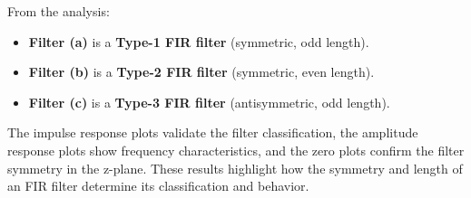 \documentclass[a4paper,12pt]{article}
\begin{document}
From the analysis:

\begin{itemize}
    \item \textbf{Filter (a)} is a \textbf{Type-1 FIR filter} (symmetric, odd length).
    \item \textbf{Filter (b)} is a \textbf{Type-2 FIR filter} (symmetric, even length).
    \item \textbf{Filter (c)} is a \textbf{Type-3 FIR filter} (antisymmetric, odd length).
\end{itemize}

The impulse response plots validate the filter classification, the amplitude response plots show frequency characteristics, and the zero plots confirm the filter symmetry in the z-plane. These results highlight how the symmetry and length of an FIR filter determine its classification and behavior.
\end{document}
